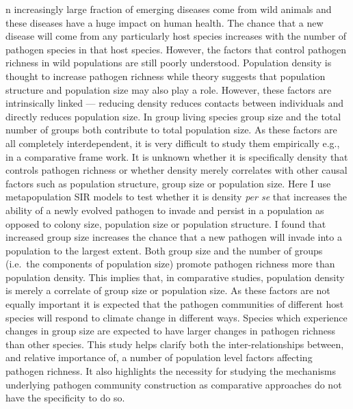 n increasingly large fraction of emerging diseases come from wild animals and these diseases have a huge impact on human health.
The chance that a new disease will come from any particularly host species increases with the number of pathogen species in that host species.
However, the factors that control pathogen richness in wild populations are still poorly understood.
Population density is thought to increase pathogen richness while theory suggests that population structure and population size may also play a role.
However, these factors are intrinsically linked --- reducing density reduces contacts between individuals and directly reduces population size.
In group living species group size and the total number of groups both contribute to total population size. 
As these factors are all completely interdependent, it is very difficult to study them empirically e.g., in a comparative frame work.
It is unknown whether it is specifically density that controls pathogen richness or whether density merely correlates with other causal factors such as population structure, group size or population size.
Here I use metapopulation SIR models to test whether it is density \emph{per se} that increases the ability of a newly evolved pathogen to invade and persist in a population as opposed to colony size, population size or population structure.
I found that increased group size increases the chance that a new pathogen will invade into a population to the largest extent.
Both group size and the number of groups (i.e.\ the components of population size) promote pathogen richness more than population density.
This implies that, in comparative studies, population density is merely a correlate of group size or population size.
As these factors are not equally important it is expected that the pathogen communities of different host species will respond to climate change in different ways.
Species which experience changes in group size are expected to have larger changes in pathogen richness than other species.
This study helps clarify both the inter-relationships between, and relative importance of, a number of population level factors affecting pathogen richness. 
It also highlights the necessity for studying the mechanisms underlying pathogen community construction as comparative approaches do not have the specificity to do so.



